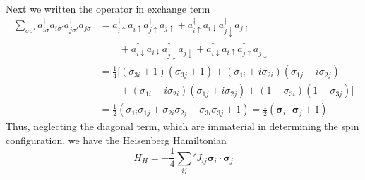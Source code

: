 \documentclass[../../../main.tex]{subfiles}
\begin{document}
Next we written the operator in exchange term
\begin{align*}
    \sum_{\sigma\sigma'} a_{i\sigma}^\dagger a_{i\sigma'} a_{j\sigma'}^\dagger a_{j\sigma}
     & =   a_{i\uparrow}^\dagger a_{i\uparrow} a_{j\uparrow}^\dagger a_{j\uparrow} + a_{i\uparrow}^\dagger a_{i\downarrow} a_{j\downarrow}^\dagger a_{j\uparrow}                        \\
     & \qquad+ a_{i\downarrow}^\dagger a_{i\downarrow} a_{j\downarrow}^\dagger a_{j\downarrow}    + a_{i\downarrow}^\dagger a_{i\uparrow} a_{j\uparrow}^\dagger a_{j\downarrow}         \\
     & = \frac{1}{4}\big[(\sigma_{3i}+1)(\sigma_{3j}+1)+(\sigma_{1i}+i\sigma_{2i})(\sigma_{1j}-i\sigma_{2j})                                                                            \\
     & \qquad+(\sigma_{1i}-i\sigma_{2i})(\sigma_{1j}+i\sigma_{2j})+(1-\sigma_{3i})(1-\sigma_{3j})\big]                                                                                  \\
     & = \frac{1 }{2 }\left( \sigma_{1i  }\sigma_{1j} +\sigma_{2i  }\sigma_{2j}+\sigma_{3i  }\sigma_{3j}+1\right) = \frac{1 }{2 } (\boldsymbol{\sigma}_i \cdot \boldsymbol{\sigma}_j+1)
\end{align*}
Thus, neglecting the diagonal term, which are immaterial in determining the spin configuration, we have the Heisenberg Hamiltonian
\begin{equation*}
    H_H = -\frac{1 }{4 }\sum_{ij}{}' J_{ij} \boldsymbol{\sigma}_i \cdot \boldsymbol{\sigma}_j
\end{equation*}
\end{document}
